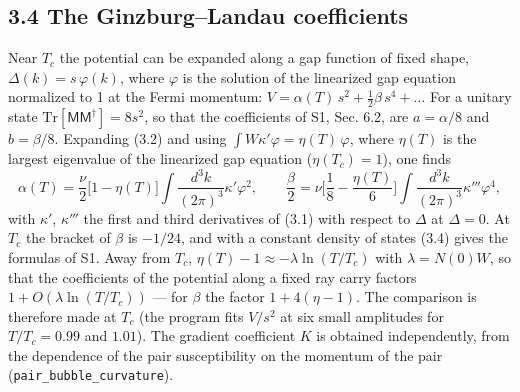 \documentclass[
  10pt,
]{article}
\begin{document}
\hypertarget{the-ginzburglandau-coefficients}{%
\subsection{3.4 The Ginzburg--Landau
coefficients}\label{the-ginzburglandau-coefficients}}

Near \(T_c\) the potential can be expanded along a gap function of fixed
shape, \(\Delta(k)=s\,\varphi(k)\), where \(\varphi\) is the solution of
the linearized gap equation normalized to 1 at the Fermi momentum:
\(V=\alpha(T)\,s^2+\tfrac12\beta\,s^4+\dots\) For a unitary state
\(\mathrm{Tr}[\mathsf M\mathsf M^\dagger]=8s^2\), so that the
coefficients of S1, Sec. 6.2, are \(a=\alpha/8\) and \(b=\beta/8\).
Expanding (3.2) and using \(\int W\kappa'\varphi=\eta(T)\,\varphi\),
where \(\eta(T)\) is the largest eigenvalue of the linearized gap
equation (\(\eta(T_c)=1\)), one finds
\[\alpha(T)=\frac\nu2\big[1-\eta(T)\big]\!\int\!\!\frac{d^3k}{(2\pi)^3}\kappa'\varphi^2,\qquad
\frac\beta2=\nu\Big[\frac18-\frac{\eta(T)}{6}\Big]\!\int\!\!\frac{d^3k}{(2\pi)^3}\kappa'''\varphi^4,\tag{3.4}\]
with \(\kappa'\), \(\kappa'''\) the first and third derivatives of (3.1)
with respect to \(\Delta\) at \(\Delta=0\). At \(T_c\) the bracket of
\(\beta\) is \(-1/24\), and with a constant density of states (3.4)
gives the formulas of S1. Away from \(T_c\),
\(\eta(T)-1\approx-\lambda\ln(T/T_c)\) with \(\lambda=N(0)W\), so that
the coefficients of the potential along a fixed ray carry factors
\(1+O(\lambda\ln(T/T_c))\) --- for \(\beta\) the factor \(1+4(\eta-1)\).
The comparison is therefore made at \(T_c\) (the program fits \(V/s^2\)
at six small amplitudes for \(T/T_c=0.99\) and \(1.01\)). The gradient
coefficient \(K\) is obtained independently, from the dependence of the
pair susceptibility on the momentum of the pair
(\texttt{pair\_bubble\_curvature}).
\end{document}

